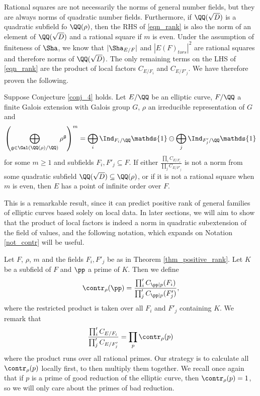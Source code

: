 Rational squares are not necessarily the norms of general number fields, but they are always norms of quadratic number fields. Furthermore, if $\QQ(\sqrt{D})$ is a quadratic subfield fo $\QQ(\rho)$, then the RHS of \eqref{eqn_rank} is also the norm of an element of $\QQ(\sqrt{D})$ and a rational square if $m$ is even. Under the assumption of finiteness of $\Sha$, we know that $|\Sha_{E/F}|$ and $|E(F)_{tors}|^2$ are rational squares and therefore norms of $\QQ(\sqrt{D})$. The only remaining terms on the LHS of \eqref{eqn_rank} are the product of local factors $C_{E/F_i}$ and $C_{E/F'_j}$. We have therefore proven the following.

\begin{thm}\cite[Theorem 33]{DEW1} \label{thm_positive_rank}
    Suppose Conjecture \ref*{conj_4} holds. Let $E/\QQ$ be an elliptic curve, $F/\QQ$ a finite Galois extension with Galois group $G$, $\rho$ an irreducible representation of $G$ and  
    $$\left(\bigoplus_{\mathfrak{g}\in\Gal(\QQ(\rho)/\QQ)}\rho^{\mathfrak{g}}\right)^m=\bigoplus_i\Ind_{F_i/\QQ}\mathds{1}\ominus\bigoplus_j\Ind_{F'_j/\QQ}\mathds{1}$$
    for some $m\geq 1$ and subfields $F_i,F'_j\subseteq F$. If either $\frac{\prod_i C_{E/F_i}}{\prod_j C_{E/F'_j}}$ is not a norm from some quadratic subfield $\QQ(\sqrt{D})\subseteq\QQ(\rho)$, or if it is not a rational square when $m$ is even, then $E$ has a point of infinite order over $F$.
\end{thm}

This is a remarkable result, since it can predict positive rank of general families of elliptic curves based solely on local data. In later sections, we will aim to show that the product of local factors is indeed a norm in quadratic subextension of the field of values, and the following notation, which expands on Notation \ref*{not_contr} will be useful.

\begin{notation} \label{not_total_contr}
    Let $F$, $\rho$, $m$ and the fields $F_i,F'_j$ be as in Theorem \ref*{thm_positive_rank}. Let $K$ be a subfield of $F$ and $\pp$ a prime of $K$. Then we define
    $$\contr_\rho(\pp)=\frac{\prod'_i C_{\pp\mid p}(F_i)}{\prod'_j C_{\pp\mid p}(F'_j)},$$
    where the restricted product is taken over all $F_i$ and $F'_j$ containing $K$.
    We remark that 
    $$\frac{\prod'_i C_{E/F_i}}{\prod'_j C_{E/F'_j}}=\prod_p\contr_\rho(p)$$
    where the product runs over all rational primes. Our strategy is to calculate all $\contr_\rho(p)$ locally first, to then multiply them together. We recall once again that if $p$ is a prime of good reduction of the elliptic curve, then $\contr_\rho(p)=1$, so we will only care about the primes of bad reduction.
\end{notation}

